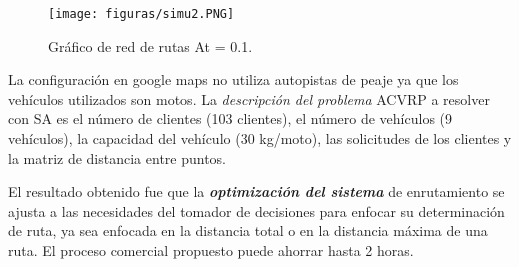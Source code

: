 \documentclass[10pt,conference]{IEEEtran}
\begin{document}
\begin{enumerate}
\begin{figure}[H]
\begin{center}
\texttt{[image: figuras/simu2.PNG]}
\caption{Gráfico de red de rutas At = 0.1.}
\label{simu2} 
\end{center}
\end{figure}

La configuración en google maps no utiliza autopistas de peaje ya que los vehículos utilizados son motos. La \textit{descripción del problema} ACVRP a resolver con SA es el número de clientes (103 clientes), el número de vehículos (9 vehículos), la capacidad del vehículo (30 kg/moto), las solicitudes de los clientes y la matriz de distancia entre puntos.

El resultado obtenido fue que la \textit{\textbf{optimización del sistema}} de enrutamiento se ajusta a las necesidades del tomador de decisiones para enfocar su determinación de ruta, ya sea enfocada en la distancia total o en la distancia máxima de una ruta. El proceso comercial propuesto puede ahorrar hasta 2 horas.
\end{enumerate}

\end{document}
